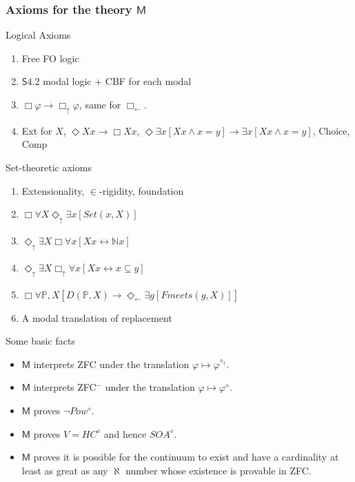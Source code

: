 \documentclass[handout]{beamer}
\newcommand{\du}{\Diamond_\uparrow}
\newcommand{\dl}{\Diamond_\leftarrow}
\newcommand{\bu}{\Box_\uparrow}
\newcommand{\bl}{\Box_\leftarrow}
\begin{document}
\begin{frame}
    \frametitle{Axioms for the theory $\mathsf{M}$}
    \begin{block}{Logical Axioms}
    \begin{enumerate}
        \item<2-> Free FO logic
        \item<3-> $\mathsf{S4.2}$ modal logic + CBF for each modal
        \item<4-> $\Box \varphi \rightarrow \bu \varphi$, same for $\bl$.
        \item<5-> Ext for $X$, $\Diamond Xx \rightarrow \Box Xx$, 
        $\Diamond \exists x[Xx \wedge x = y] \rightarrow \exists x[Xx \wedge x = y]$,
        Choice, Comp
    \end{enumerate}
    \end{block}
    \begin{block}{Set-theoretic axioms}
        \begin{enumerate}
        \item<7-> Extensionality, $\in$-rigidity, foundation
        \item<8-> $\Box \forall X \du \exists x [Set(x, X)]$
        \item<9-> $\du \exists X \Box \forall x[Xx \leftrightarrow \mathbb{N}x]$
        \item<10-> $\du \exists X \bu \forall x[Xx \leftrightarrow x \subseteq y]$
        \item<11-> $\Box \forall \mathbb{P}, X [D(\mathbb{P}, X)\rightarrow \dl \exists g[Fmeets(g, X)]]$
        \item<12-> A modal translation of replacement
        \end{enumerate}
    \end{block}
\end{frame}
\begin{frame}{Some basic facts}
    \begin{itemize}
        \item<2-> $\mathsf{M}$ interprets ZFC under the translation 
                    $\varphi \mapsto \varphi^{\diamond_\uparrow}$. 
        \item<3-> $\mathsf{M}$ interprets ZFC$^-$ under the translation 
                    $\varphi \mapsto \varphi^\diamond$.
        \item<4-> $\mathsf{M}$ proves $\neg Pow^\diamond$.
        \item<5-> $\mathsf{M}$ proves $V = HC^\diamond$ and hence $SOA^\diamond$.
        \item<6-> $\mathsf{M}$ proves it is possible for the continuum 
                    to exist and have a cardinality at least as great as 
                    any $\aleph$ number whose existence is provable 
                    in ZFC.
    \end{itemize}
\end{frame}
\end{document}
